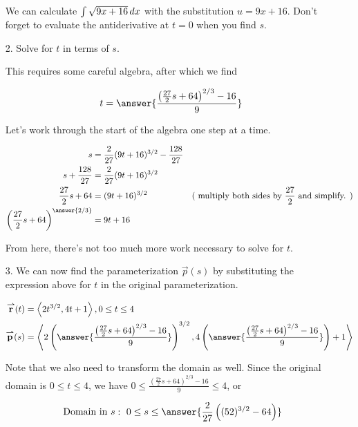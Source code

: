\documentclass{ximera}
\begin{document}
\begin{exercise}
\begin{exercise}
\begin{itemize}
\begin{hint}
We can calculate $\int \sqrt{9x+16} \mathop{}\!d x$ with the substitution $u=9x+16$.  Don't forget to evaluate the antiderivative at $t=0$ when you find $s$.

\end{hint}

\item[2.] Solve for $t$ in terms of $s$.

This requires some careful algebra, after which we find

\[
t = \answer{\frac{\left(\frac{27}{2}s+64\right)^{2/3}-16}{9}}
\]

\begin{hint}
Let's work through the start of the algebra one step at a time.

\begin{align*}
s &= \frac{2}{27} (9t+16)^{3/2} - \frac{128}{27} \\
s +\frac{128}{27} &=  \frac{2}{27} (9t+16)^{3/2} \\
\frac{27}{2}s +64 &= (9t+16)^{3/2}& (\textrm{ multiply both sides by } \frac{27}{2} \textrm{ and simplify. } ) \\
\left(\frac{27}{2}s +64\right)^{\answer{2/3}} &= 9t+16 \\
\end{align*}

From here, there's not too much more work necessary to solve for $t$.
\end{hint}

\item[3.] We can now find the parameterization $\vec{p}(s)$ by substituting the expression above for $t$ in the original parameterization. 

\begin{align*}
\vec{r}(t) &= \vector{2t^{3/2},4t+1} , 0 \leq t \leq 4 \\
\vec{p}(s) &= \vector{2\left(\answer{\frac{\left(\frac{27}{2}s+64\right)^{2/3}-16}{9} } \right)^{3/2},4\left( \answer{\frac{\left(\frac{27}{2}s+64\right)^{2/3}-16}{9}} \right)+1}
\end{align*} 

Note that we also need to transform the domain as well.  Since the original domain is $0 \leq t \leq 4$, we have $0 \leq \frac{\left(\frac{27}{2}s+64\right)^{2/3}-16}{9} \leq 4$, or 

\[
\textrm{ Domain in } s: ~ 0 \leq s \leq \answer{\frac{2}{27}\left((52)^{3/2}-64\right)}
\]
\end{itemize}


\end{exercise}
\end{exercise}
\end{document}
